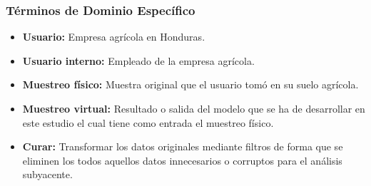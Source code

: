 \documentclass[conference]{IEEEtran}
\begin{document}
\subsubsection{Términos de Dominio Específico}

\begin{itemize}
    \item \textbf{Usuario:} Empresa agrícola en Honduras.

    \item \textbf{Usuario interno:} Empleado de la empresa agrícola.

    \item \textbf{Muestreo físico:} Muestra original que el usuario tomó en su suelo agrícola.

    \item \textbf{Muestreo virtual:} Resultado o salida del modelo que se ha de desarrollar en este estudio el cual tiene como entrada el muestreo físico.

    \item \textbf{Curar:} Transformar los datos originales mediante filtros de forma que se eliminen los todos aquellos datos innecesarios o corruptos para el análisis subyacente.
\end{itemize}

\printbibliography
\end{document}
